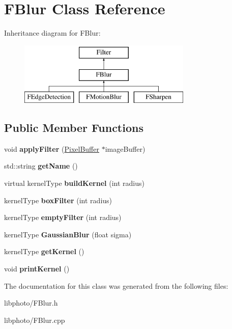 \hypertarget{classFBlur}{\section{F\-Blur Class Reference}
\label{classFBlur}
}
Inheritance diagram for F\-Blur\-:\begin{figure}[H]
\begin{center}
\leavevmode
\includegraphics[height=3.000000cm]{classFBlur}
\end{center}
\end{figure}
\subsection*{Public Member Functions}
\begin{DoxyCompactItemize}
\item 
\hypertarget{classFBlur_a20d9f9bb8f2b787273a860779853a8fd}{void {\bfseries apply\-Filter} (\hyperlink{classPixelBuffer}{Pixel\-Buffer} $\ast$image\-Buffer)}\label{classFBlur_a20d9f9bb8f2b787273a860779853a8fd}

\item 
\hypertarget{classFBlur_a3c121581f48e00e0267f88826808ee23}{std\-::string {\bfseries get\-Name} ()}\label{classFBlur_a3c121581f48e00e0267f88826808ee23}

\item 
\hypertarget{classFBlur_ad7d9aa0fa6b3b4f4ead1545ccf6a6628}{virtual kernel\-Type {\bfseries build\-Kernel} (int radius)}\label{classFBlur_ad7d9aa0fa6b3b4f4ead1545ccf6a6628}

\item 
\hypertarget{classFBlur_a97ca2bede17042bae70d781859d46e73}{kernel\-Type {\bfseries box\-Filter} (int radius)}\label{classFBlur_a97ca2bede17042bae70d781859d46e73}

\item 
\hypertarget{classFBlur_ab13f7d8c36423e3f0ecabdcd9b045fbf}{kernel\-Type {\bfseries empty\-Filter} (int radius)}\label{classFBlur_ab13f7d8c36423e3f0ecabdcd9b045fbf}

\item 
\hypertarget{classFBlur_ad88afc728cb9b8c84443a0bf4a30983f}{kernel\-Type {\bfseries Gaussian\-Blur} (float sigma)}\label{classFBlur_ad88afc728cb9b8c84443a0bf4a30983f}

\item 
\hypertarget{classFBlur_a7cb16fe19cd319be83d95de5686e8d39}{kernel\-Type {\bfseries get\-Kernel} ()}\label{classFBlur_a7cb16fe19cd319be83d95de5686e8d39}

\item 
\hypertarget{classFBlur_a5f500e9bad040039fb43e58be03d57e6}{void {\bfseries print\-Kernel} ()}\label{classFBlur_a5f500e9bad040039fb43e58be03d57e6}

\end{DoxyCompactItemize}


The documentation for this class was generated from the following files\-:\begin{DoxyCompactItemize}
\item 
libphoto/F\-Blur.\-h\item 
libphoto/F\-Blur.\-cpp\end{DoxyCompactItemize}

